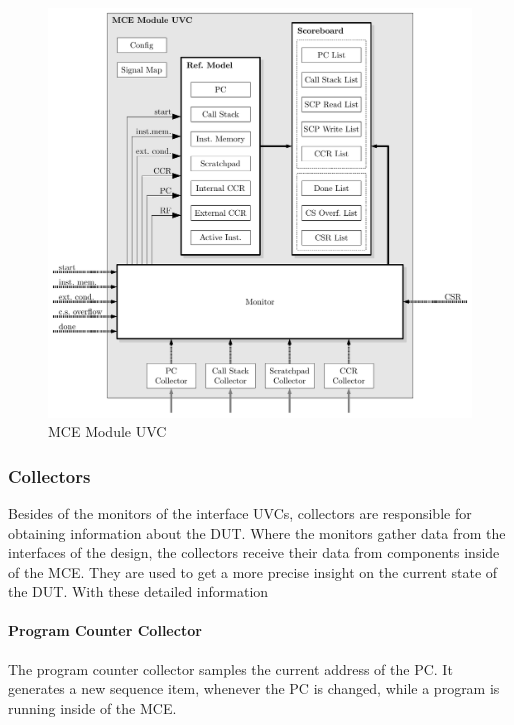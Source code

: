 \begin{figure}[htb]
 \centering
 \includegraphics[width=1.0\textwidth,angle=0]{images/mce_module_uvc}
 \caption{MCE Module UVC}
\label{fig:module_uvc}
\end{figure}

\subsubsection{Collectors}

Besides of the monitors of the interface UVCs, collectors are responsible for obtaining information about the DUT.
Where the monitors gather data from the interfaces of the design, the collectors receive their data from components inside of the MCE.
They are used to get a more precise insight on the current state of the DUT.
With these detailed information 
 

\paragraph{Program Counter Collector}

The program counter collector samples the current address of the PC.
It generates a new sequence item, whenever the PC is changed, while a program is running inside of the MCE.


